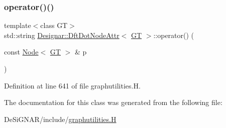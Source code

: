 \subsubsection{\texorpdfstring{operator()()}{operator()()}}
{\footnotesize\ttfamily template$<$class GT$>$ \\
std\+::string \hyperlink{class_designar_1_1_dft_dot_node_attr}{Designar\+::\+Dft\+Dot\+Node\+Attr}$<$ \hyperlink{demo-buildgraph_8_c_a3001c40d2c31ca87ed96cd7d1334a55e}{GT} $>$\+::operator() (\begin{DoxyParamCaption}\item[{const \hyperlink{namespace_designar_a5af326c65aa2bd26b26c410f2030d09e}{Node}$<$ \hyperlink{demo-buildgraph_8_c_a3001c40d2c31ca87ed96cd7d1334a55e}{GT} $>$ \&}]{p }\end{DoxyParamCaption})\hspace{0.3cm}{\ttfamily [inline]}}



Definition at line 641 of file graphutilities.\+H.



The documentation for this class was generated from the following file\+:\begin{DoxyCompactItemize}
\item 
De\+Si\+G\+N\+A\+R/include/\hyperlink{graphutilities_8_h}{graphutilities.\+H}\end{DoxyCompactItemize}
